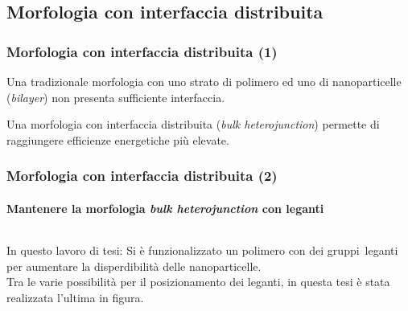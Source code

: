 \subsection{Morfologia con interfaccia distribuita}
\begin{frame}
\frametitle{Morfologia con interfaccia distribuita (1)}
Una tradizionale morfologia con uno strato di polimero ed uno di nanoparticelle (\emph{bilayer}) non presenta sufficiente interfaccia.
 \begin{figure}\end{figure}
Una morfologia con interfaccia distribuita (\emph{bulk heterojunction}) permette di raggiungere efficienze energetiche più elevate.


\end{frame}

\begin{frame}
\frametitle{Morfologia con interfaccia distribuita (2)}
\framesubtitle{Mantenere la morfologia \emph{bulk heterojunction} con leganti}
\begin{columns}
\begin{block}{In questo lavoro di tesi:} Si è funzionalizzato un polimero con dei \alert{gruppi~leganti} per aumentare la disperdibilità delle nanoparticelle.\\
Tra le varie possibilità per il posizionamento dei leganti, in questa tesi è stata realizzata l'\alert{ultima in figura}.\end{block}
\end{columns}
\end{frame}
